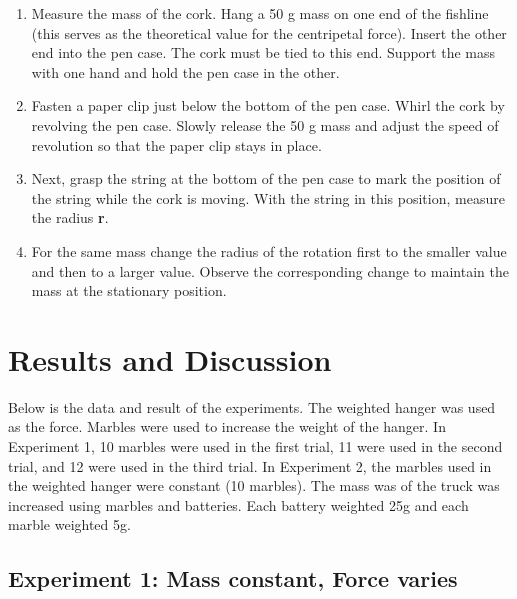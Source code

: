 \documentclass[a4paper,12pt]{article}
\begin{document}
\begin{enumerate}
    \item Measure the mass of the cork. Hang a 50 g mass on one end of the fishline (this serves as the theoretical value for the centripetal force). Insert the other end into the pen case. The cork must be tied to this end. Support the mass with one hand and hold the pen case in the other.
    \item Fasten a paper clip just below the bottom of the pen case. Whirl the cork by revolving the pen case. Slowly release the 50 g mass and adjust the speed of revolution so that the paper clip stays in place.
    \item Next, grasp the string at the bottom of the pen case to mark the position of the string while the cork is moving. With the string in this position, measure the radius \textbf{r}.
    \item For the same mass change the radius of the rotation first to the smaller value and then to a larger value. Observe the corresponding change to maintain the mass at the stationary position.
\end{enumerate}


\section{Results and Discussion}
Below is the data and result of the experiments. The weighted hanger was used as the force. Marbles were used to increase the weight of the hanger. In Experiment 1, 10 marbles were used in the first trial, 11 were used in the second trial, and 12 were used in the third trial. In Experiment 2, the marbles used in the weighted hanger were constant (10 marbles). The mass was of the truck was increased using marbles and batteries. Each battery weighted 25g and each marble weighted 5g.

\subsection{Experiment 1: Mass constant, Force varies}
\begin{table}[h]
    \centering
    \renewcommand{\arraystretch}{1.2}
    \caption{Results of the Experiment}
    \label{table:exp}
\end{table}
\end{document}
